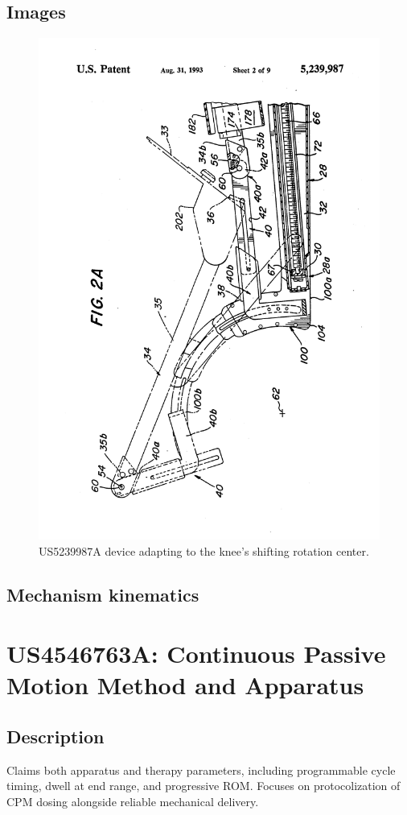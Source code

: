 \documentclass[11pt]{article}
\begin{document}
\subsection{Images}
\begin{figure}[H]
  \centering
  \includegraphics[width=0.54\linewidth, angle=-90]{US5239987-drawings-page-3.png}
  \caption{US5239987A device adapting to the knee’s shifting rotation center.}
  \label{fig:US5239987A}
\end{figure}

\subsection{Mechanism kinematics}

\section{US4546763A: Continuous Passive Motion Method and Apparatus}
\subsection{Description}
Claims both apparatus and therapy parameters, including programmable cycle timing, dwell at end range, and progressive ROM. Focuses on protocolization of CPM dosing alongside reliable mechanical delivery.
\end{document}
